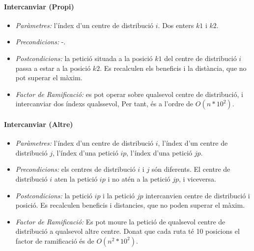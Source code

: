 \documentclass[a4paper]{article}
\begin{document}
\paragraph{Intercanviar (Propi)}
\begin{itemize}
\item \emph{Paràmetres:} l'índex d'un centre de distribució $i$. Dos enters $k1$ i $k2$.
\item \emph{Precondicions:} -.
\item \emph{Postcondicions:} la petició situada a la posició $k1$ del centre de distribució $i$ passa a estar a la posició $k2$. Es recalculen els beneficis i la distància, que no pot superar el màxim.
\item \emph{Factor de Ramificació:} es pot operar sobre qualsevol centre de distribució, i intercanviar dos índexs qualssevol, Per tant, és a l'ordre de $O(n*10^2)$.
\end{itemize}

\paragraph{Intercanviar (Altre)}
\begin{itemize}
\item \emph{Paràmetres:} l'índex d'un centre de distribució $i$, l'índex d'un centre de distribució $j$, l'índex d'una petició $ip$, l'índex d'una petició $jp$.
\item \emph{Precondicions:} els centres de distribució $i$ i $j$ són diferents. El centre de distribució $i$ aten la petició $ip$ i no atén a la petició $jp$, i viceversa.
\item \emph{Postcondicions:} la petició $ip$ i la petició $jp$ intercanvien centre de distribució i posició. Es recalculen beneficis i distancies, que no poden superar el màxim.
\item \emph{Factor de Ramificació:} Es pot moure la petició de qualsevol centre de distribució a qualsevol altre centre. Donat que cada ruta té 10 posicions el factor de ramificació és de $O(n^2*10^2)$.
\end{itemize}
\end{document}
